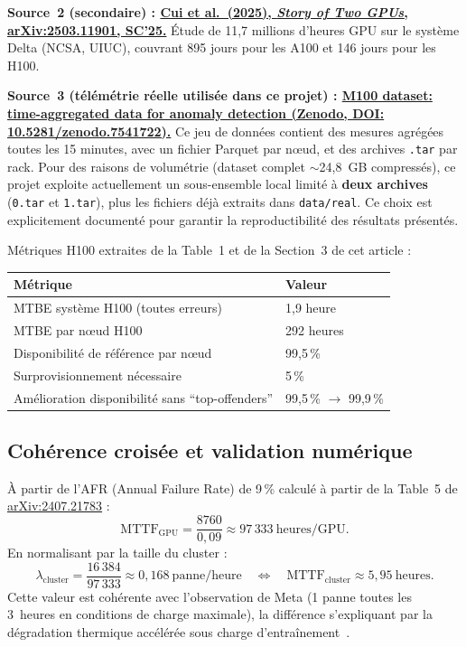 \documentclass[12pt,a4paper]{article}
\begin{document}
\textbf{Source~2 (secondaire) :
\href{https://arxiv.org/pdf/2503.11901}{Cui et al.\ (2025), \textit{Story of Two GPUs},
arXiv:2503.11901, SC'25.}}
Étude de 11,7 millions d'heures GPU sur le système Delta (NCSA, UIUC),
couvrant 895 jours pour les A100 et 146 jours pour les H100.

\textbf{Source~3 (télémétrie réelle utilisée dans ce projet) :
\href{https://zenodo.org/records/7541722}{M100 dataset: time-aggregated data for anomaly detection (Zenodo, DOI: 10.5281/zenodo.7541722).}}
Ce jeu de données contient des mesures agrégées toutes les 15 minutes, avec un fichier Parquet par nœud,
et des archives \texttt{.tar} par rack. Pour des raisons de volumétrie (dataset complet \(\sim\)24,8~GB compressés),
ce projet exploite actuellement un sous-ensemble local limité à \textbf{deux archives} (\texttt{0.tar} et \texttt{1.tar}),
plus les fichiers déjà extraits dans \texttt{data/real}. Ce choix est explicitement documenté pour garantir
la reproductibilité des résultats présentés.

Métriques H100 extraites de la Table~1 et de la Section~3 de cet article :
\begin{center}
\begin{tabular}{ll}
\toprule
Métrique & Valeur \\
\midrule
MTBE système H100 (toutes erreurs) & 1,9 heure \\
MTBE par nœud H100 & 292 heures \\
Disponibilité de référence par nœud & 99,5\,\% \\
Surprovisionnement nécessaire & 5\,\% \\
Amélioration disponibilité sans ``top-offenders'' & 99,5\,\% $\to$ 99,9\,\% \\
\bottomrule
\end{tabular}
\end{center}

\subsection{Cohérence croisée et validation numérique}

À partir de l'AFR (Annual Failure Rate) de 9\,\% calculé à partir de la Table~5 de
\href{https://arxiv.org/pdf/2407.21783}{arXiv:2407.21783} :
\[
\mathrm{MTTF}_{\text{GPU}} = \frac{8760}{0{,}09} \approx 97\,333\ \text{heures/GPU}.
\]
En normalisant par la taille du cluster :
\[
\lambda_{\text{cluster}} = \frac{16\,384}{97\,333} \approx 0{,}168\ \text{panne/heure}
\quad\Leftrightarrow\quad \mathrm{MTTF}_{\text{cluster}} \approx 5{,}95\ \text{heures}.
\]
Cette valeur est cohérente avec l'observation de Meta (1 panne toutes les 3~heures en conditions
de charge maximale), la différence s'expliquant par la dégradation thermique accélérée
sous charge d'entraînement~\cite{epoch2024}.
\end{document}
